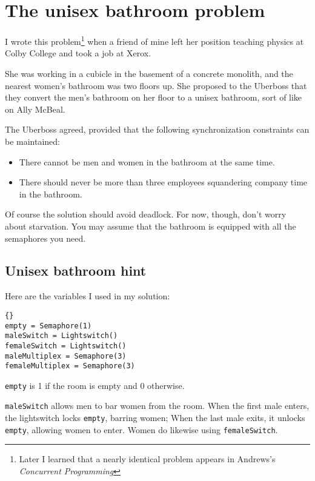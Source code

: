 \documentclass{book}
\newcommand{\clearemptydoublepage}{\newpage\cleardoublepage}
\begin{document}
\section{The unisex bathroom problem}

I wrote this problem\footnote{Later I learned that a nearly
identical problem appears in Andrews's 
{\em Concurrent Programming}\cite{andrews}} when a friend of mine
left her position teaching physics at Colby College
and took a job at Xerox.

She was working in a cubicle in the basement of a
concrete monolith, and the nearest women's bathroom was two floors up.
She proposed to the Uberboss that they convert the men's bathroom
on her floor to a unisex bathroom, sort of like on Ally McBeal.

The Uberboss agreed, provided that the following synchronization
constraints can be maintained:

\begin {itemize}

\item There cannot be men and women in the bathroom
at the same time.

\item There should never be more than three
employees squandering company time in the bathroom.

\end{itemize}

Of course the solution should avoid deadlock.  For now, though, don't
worry about starvation.  You may assume that the bathroom is equipped
with all the semaphores you need.


\clearemptydoublepage
\subsection {Unisex bathroom hint}

Here are the variables I used in my solution:

\begin{lstlisting}[title={Unisex bathroom hint}]{}
empty = Semaphore(1)
maleSwitch = Lightswitch()
femaleSwitch = Lightswitch()
maleMultiplex = Semaphore(3)
femaleMultiplex = Semaphore(3)
\end{lstlisting}

{\tt empty} is 1 if the room is empty and 0 otherwise.

{\tt maleSwitch} allows men to bar women from the room.
When the first male enters, the lightswitch locks {\tt empty}, barring women;
When the last male exits, it unlocks {\tt empty}, allowing women
to enter.  Women do likewise using {\tt femaleSwitch}.
\end{document}
